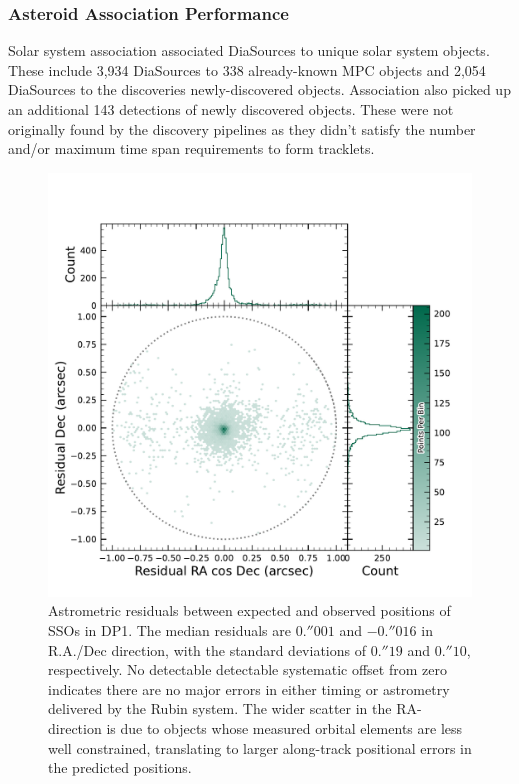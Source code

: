 \subsubsection{Asteroid Association Performance}

Solar system association associated \nsolarsystemsources DiaSources to \nsolarsystemobjects unique solar system objects. 
These include 3,934 DiaSources to 338 already-known MPC objects and 2,054 DiaSources to the \nnewasteroiddiscoveries discoveries newly-discovered objects. 
Association also picked up an additional 143 detections of newly discovered objects. 
These were not originally found by the discovery pipelines as they didn't satisfy the number and/or maximum time span requirements to form tracklets.

\begin{figure}[htb!]
\centering
\includegraphics[width=0.98\linewidth]{figures/sso_residuals.pdf}
\caption{Astrometric residuals between expected and observed positions of SSOs in DP1. The median residuals are $0.''001$ and $-0.''016$ in R.A./Dec direction, with the standard deviations of $0.''19$ and $0.''10$, respectively. No detectable detectable systematic offset from zero indicates there are no major errors in either timing or astrometry delivered by the Rubin system. The wider scatter in the RA-direction is due to objects whose measured orbital elements are less well constrained, translating to larger along-track positional errors in the predicted positions.}
\label{fig:sso_residuals}
\vspace{0.1cm}
\end{figure}

